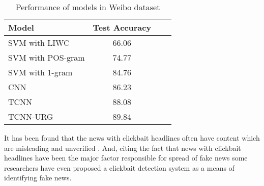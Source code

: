 \begin{table}[h]
\begin{center}
\caption{Performance of models in Weibo dataset}
\label{tbl:weibo_performance}
\begin{tabular}{@{}lccc@{}}
\toprule 
\rule[-1pt]{0pt}{14pt}Model&Test Accuracy\\
\midrule 
\rule[-1pt]{0pt}{14pt}SVM with LIWC&66.06\\
\rule[-1pt]{0pt}{14pt}SVM with POS-gram&74.77\\
\rule[-1pt]{0pt}{14pt}SVM with 1-gram&84.76\\
\rule[-1pt]{0pt}{14pt}CNN&86.23\\
\rule[-1pt]{0pt}{14pt}TCNN&88.08\\
\rule[-1pt]{0pt}{14pt}TCNN-URG&89.84\\
\bottomrule
\end{tabular}
\end{center}
\end{table}

It has been found that the news with clickbait headlines often have content which are misleading and unverified \cite{silverman2015lies}. And, citing the fact that news with clickbait headlines have been the major factor responsible for spread of fake news \cite{silverman2015lies} some researchers have even proposed a clickbait detection system as a means of identifying fake news\cite{chen2015misleading}. 